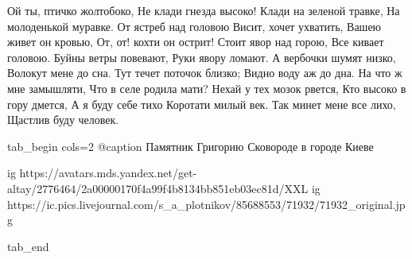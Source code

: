 \raggedcolumns
\begin{multicols}{2} %
\setlength{\parindent}{0pt}
\obeycr
Ой ты, птичко жолтобоко,
Не клади гнезда высоко!
Клади на зеленой травке,
На молоденькой муравке.
\smallskip
От ястреб над головою
Висит, хочет ухватить,
Вашею живет он кровью,
От, от! кохти он острит!
\smallskip
Стоит явор над горою,
Все кивает головою.
Буйны ветры повевают,
Руки явору ломают.
\smallskip
А вербочки шумят низко,
Волокут мене до сна.
Тут течет поточок близко;
Видно воду аж до дна.
\smallskip
На что ж мне замышляти,
Что в селе родила мати?
Нехай у тех мозок рвется,
Кто высоко в гору дмется,
\smallskip
А я буду себе тихо
Коротати милый век.
\smallskip
Так минет мене все лихо,
Щастлив буду человек.
\restorecr
\end{multicols} %

\ifcmt
tab_begin cols=2
  @caption Памятник Григорию Сковороде в городе Киеве

  ig https://avatars.mds.yandex.net/get-altay/2776464/2a00000170f4a99f4b8134bb851eb03ec81d/XXL
	ig https://ic.pics.livejournal.com/s_a_plotnikov/85688553/71932/71932_original.jpg

tab_end
\fi

